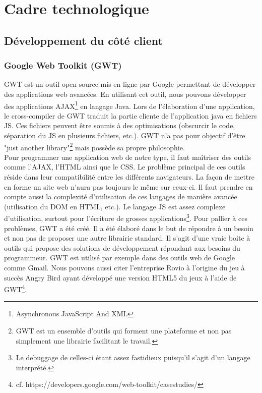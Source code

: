 
\chapter{Cadre technologique}


\section{Développement du côté client}
\subsection{Google Web Toolkit (GWT)}

GWT est un outil open source mis en ligne par Google permettant de développer des applications web avancées. En utilisant cet outil, nous pouvons développer des applications AJAX\footnote{Asynchronous JavaScript And XML} en langage Java.
Lors de l'élaboration d'une application, le cross-compiler de GWT traduit la partie cliente de l'application java en 
fichiers JS. Ces fichiers peuvent être soumis à des optimisations (obscurcir le code, séparation du JS en plusieurs fichiers, etc.). GWT n'a pas pour objectif d'être "just another library"\footnote{GWT est un ensemble d'outils qui forment une plateforme et non pas simplement une librairie facilitant le travail.} mais possède sa propre philosophie.\\
\newline
\indent
Pour programmer une application web de notre type, il faut maîtriser des outils comme l'AJAX, l'HTML ainsi que le CSS. Le problème principal de ces outils réside dans leur compatibilité entre les différents navigateurs. La façon de mettre en forme un site web n'aura pas toujours le même sur ceux-ci. Il faut prendre en compte aussi la complexité d'utilisation de ces langages de manière avancée (utilisation du DOM en HTML, etc.). Le langage JS est assez complexe d'utilisation, surtout pour l'écriture de grosses applications\footnote{Le debuggage de celles-ci étant assez fastidieux puisqu'il s'agit d'un langage interprété.}.
\newline
\indent
Pour pallier à ces problèmes, GWT a été créé. Il a été élaboré dans le but de répondre à un besoin et non pas de proposer une autre librairie standard. Il s'agit d'une vraie boite à outils qui propose des solutions de développement répondant aux besoins du programmeur.
\newline
\indent
GWT est utilisé par exemple dans des outils web de Google comme Gmail. Nous pouvons aussi citer l'entreprise Rovio à l'origine du jeu à succès Angry Bird ayant développé une version HTML5 du jeux à l'aide de GWT\footnote{cf. https://developers.google.com/web-toolkit/casestudies/}.

